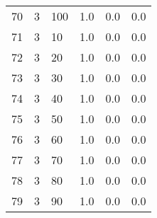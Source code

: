 \documentclass{article}
\begin{document}
{\begin{tabular}{llllll}
70 &         3 &        100 &              1.0 &                       0.0 &                                   0.0 \\
71 &         3 &         10 &              1.0 &                       0.0 &                                   0.0 \\
72 &         3 &         20 &              1.0 &                       0.0 &                                   0.0 \\
73 &         3 &         30 &              1.0 &                       0.0 &                                   0.0 \\
74 &         3 &         40 &              1.0 &                       0.0 &                                   0.0 \\
75 &         3 &         50 &              1.0 &                       0.0 &                                   0.0 \\
76 &         3 &         60 &              1.0 &                       0.0 &                                   0.0 \\
77 &         3 &         70 &              1.0 &                       0.0 &                                   0.0 \\
78 &         3 &         80 &              1.0 &                       0.0 &                                   0.0 \\
79 &         3 &         90 &              1.0 &                       0.0 &                                   0.0 \\
\bottomrule
\end{tabular}
}
\newpage
\end{document}
